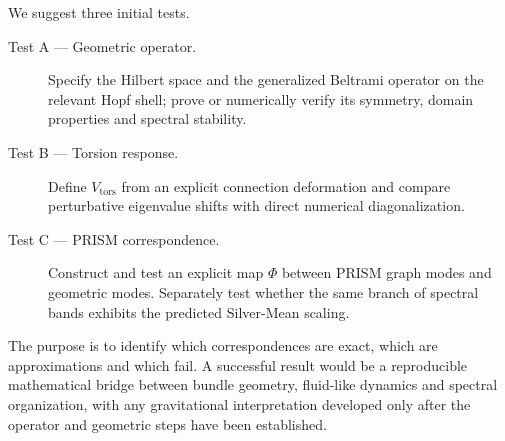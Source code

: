 \documentclass[11pt,a4paper]{article}
\begin{document}
We suggest three initial tests.

\begin{description}
\item[Test A --- Geometric operator.] Specify the Hilbert space and the
generalized Beltrami operator on the relevant Hopf shell; prove or numerically
verify its symmetry, domain properties and spectral stability.
\item[Test B --- Torsion response.] Define $V_{\mathrm{tors}}$ from an explicit
connection deformation and compare perturbative eigenvalue shifts with direct
numerical diagonalization.
\item[Test C --- PRISM correspondence.] Construct and test an explicit map
$\Phi$ between PRISM graph modes and geometric modes. Separately test whether
the same branch of spectral bands exhibits the predicted Silver-Mean scaling.
\end{description}

The purpose is to identify which correspondences are exact, which are
approximations and which fail. A successful result would be a reproducible
mathematical bridge between bundle geometry, fluid-like dynamics and spectral
organization, with any gravitational interpretation developed only after the
operator and geometric steps have been established.
\end{document}
